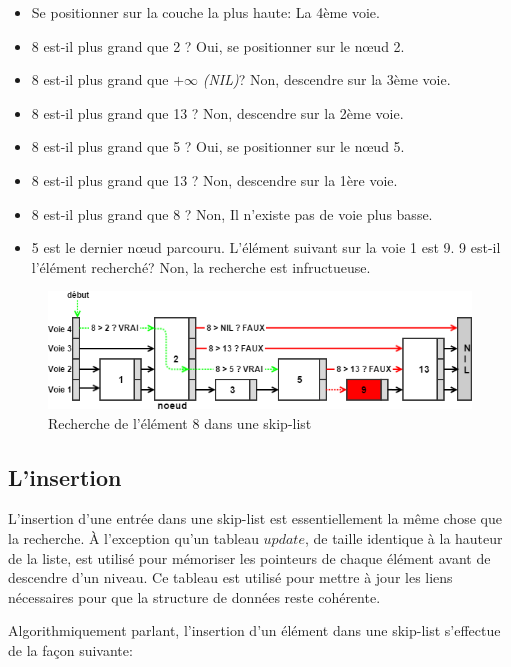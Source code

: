 \documentclass[hidelinks,a4paper, 12pt]{article}
\begin{document}
	\begin{itemize}
		\item Se positionner sur la couche la plus haute: La 4ème voie.
		\item 8 est-il plus grand que 2 ? Oui, se positionner sur le nœud 2.
		\item 8 est-il plus grand que $+\infty$ \textit{(NIL)}? Non, descendre sur la 3ème voie.
		\item 8 est-il plus grand que 13  ? Non, descendre sur la 2ème voie.
		\item 8 est-il plus grand que 5 ? Oui, se positionner sur le nœud 5.
		\item 8 est-il plus grand que 13 ? Non, descendre sur la 1ère voie.
		\item 8 est-il plus grand que 8 ? Non, Il n'existe pas de voie plus basse.
		\item 5 est le dernier nœud parcouru. L'élément suivant sur la voie 1 est 9. 9 est-il l'élément recherché? Non, la recherche est infructueuse.
	\end{itemize}
	\begin{figure}[h]
		\includegraphics[width=\textwidth]{img/search2}
		\caption{Recherche de l'élément 8 dans une skip-list}
		\label{SkipSearch2}
	\end{figure}
	
	
	\newpage
	\subsection{L'insertion}
	L'insertion d'une entrée dans une skip-list est essentiellement la même chose que la recherche. À l'exception qu'un tableau $update$, de taille identique à la hauteur de la liste, est utilisé pour mémoriser les pointeurs de chaque élément avant de descendre d'un niveau. Ce tableau est utilisé pour mettre à jour les liens nécessaires pour que la structure de données reste cohérente.
	
	Algorithmiquement parlant, l'insertion d'un élément dans une skip-list s'effectue de la façon suivante:
	
\end{document}
